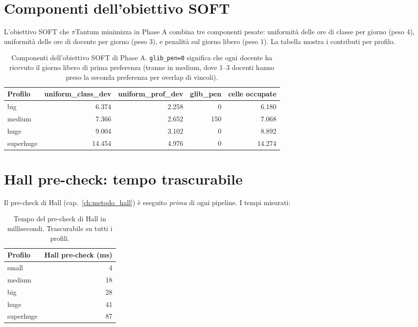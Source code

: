 \section{Componenti dell'obiettivo SOFT}

L'obiettivo SOFT che $\pi$Tantum minimizza in Phase A
combina tre componenti pesate: uniformit\`a delle ore di
classe per giorno (peso 4), uniformit\`a delle ore di docente
per giorno (peso 3), e penalit\`a sul giorno libero (peso 1).
La tabella mostra i contributi per profilo.

\begin{table}[h]
\centering
\sffamily\small
\begin{tabular}{lrrrr}
\toprule
Profilo    & uniform\_class\_dev & uniform\_prof\_dev & glib\_pen & celle occupate \\
\midrule
big        & 6.374 & 2.258 & 0   & 6.180 \\
medium     & 7.366 & 2.652 & 150 & 7.068 \\
huge       & 9.004 & 3.102 & 0   & 8.892 \\
superhuge  & 14.454 & 4.976 & 0  & 14.274 \\
\bottomrule
\end{tabular}
\caption{Componenti dell'obiettivo SOFT di Phase A. \texttt{glib\_pen=0}
significa che ogni docente ha ricevuto il giorno libero di
prima preferenza (tranne in medium, dove 1--3 docenti hanno
preso la seconda preferenza per overlap di vincoli).}
\label{tab:bench-obj}
\end{table}

\section{Hall pre-check: tempo trascurabile}

Il pre-check di Hall (cap.~\ref{ch:metodo_hall}) \`e
eseguito \emph{prima} di ogni pipeline. I tempi misurati:

\begin{table}[h]
\centering
\sffamily\small
\begin{tabular}{lr}
\toprule
Profilo    & Hall pre-check (ms) \\
\midrule
small      &  4 \\
medium     & 18 \\
big        & 28 \\
huge       & 41 \\
superhuge  & 87 \\
\bottomrule
\end{tabular}
\caption{Tempo del pre-check di Hall in millisecondi.
Trascurabile su tutti i profili.}
\label{tab:bench-hall}
\end{table}

